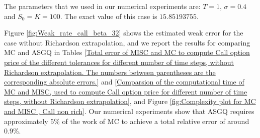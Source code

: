 The parameters that we used in our numerical experiments are: $T=1$, $\sigma=0.4$ and $S_0=K=100$. The exact value of this case is $15.85193755$.

Figure \ref{fig:Weak_rate_call_beta_32} shows the estimated   weak error  for the case without Richardson extrapolation, and we report the results for comparing MC and ASGQ in Tables \ref{Total error of MISC and MC to compute Call option price of the different tolerances for different number of time steps, without Richardson extrapolation. The numbers between parentheses are the corresponding absolute errors.} and \ref{Comparsion of the computational time of  MC and MISC, used to compute Call option price  for different number of time steps, without Richardson extrapolation}, and Figure \ref{fig:Complexity plot for MC and MISC , Call non rich}. Our numerical experiments show that ASGQ  requires approximately $5\%$ of the work of MC  to achieve a total relative error of around $0.9\%$.




